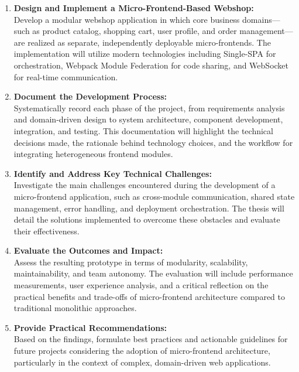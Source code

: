 \documentclass[12pt,a4paper]{report}
\begin{document}
\begin{enumerate}
    \item \textbf{Design and Implement a Micro-Frontend-Based Webshop:} \\
    Develop a modular webshop application in which core business domains—such as product catalog, shopping cart, user profile, and order management—are realized as separate, independently deployable micro-frontends. The implementation will utilize modern technologies including Single-SPA for orchestration, Webpack Module Federation for code sharing, and WebSocket for real-time communication.

    \item \textbf{Document the Development Process:} \\
    Systematically record each phase of the project, from requirements analysis and domain-driven design to system architecture, component development, integration, and testing. This documentation will highlight the technical decisions made, the rationale behind technology choices, and the workflow for integrating heterogeneous frontend modules.

    \item \textbf{Identify and Address Key Technical Challenges:} \\
    Investigate the main challenges encountered during the development of a micro-frontend application, such as cross-module communication, shared state management, error handling, and deployment orchestration. The thesis will detail the solutions implemented to overcome these obstacles and evaluate their effectiveness.

    \item \textbf{Evaluate the Outcomes and Impact:} \\
    Assess the resulting prototype in terms of modularity, scalability, maintainability, and team autonomy. The evaluation will include performance measurements, user experience analysis, and a critical reflection on the practical benefits and trade-offs of micro-frontend architecture compared to traditional monolithic approaches.

    \item \textbf{Provide Practical Recommendations:} \\
    Based on the findings, formulate best practices and actionable guidelines for future projects considering the adoption of micro-frontend architecture, particularly in the context of complex, domain-driven web applications.
\end{enumerate}
\end{document}
